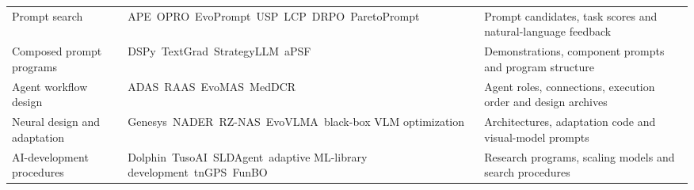 \begin{longtable}{@{}>{\raggedright\arraybackslash}p{}>{\raggedright\arraybackslash}p{}>{\raggedright\arraybackslash}p{}@{}}
\addlinespace[8pt]
Prompt search & APE~\citep{DBLP:conf/iclr/ZhouMHPPCB23}\newline OPRO~\citep{yang2024large}\newline EvoPrompt~\citep{guo2024connecting}\newline USP~\citep{wan-etal-2023-universal}\newline LCP~\citep{li-etal-2026-learning}\newline DRPO~\citep{singla-etal-2024-dynamic}\newline ParetoPrompt~\citep{zhao2025pareto} & Prompt candidates, task scores and natural-language feedback \\
\addlinespace[8pt]
Composed prompt programs & DSPy~\citep{khattab2024dspy}\newline TextGrad~\citep{Yuksekgonul2025}\newline StrategyLLM~\citep{gao2024strategyllm}\newline aPSF~\citep{liu-etal-2026-adaptive} & Demonstrations, component prompts and program structure \\
\addlinespace[8pt]
Agent workflow design & ADAS~\citep{hu2025automated}\newline RAAS~\citep{Yang2026raas}\newline EvoMAS~\citep{wei2026evomas}\newline MedDCR~\citep{zheng-etal-2026-meddcr} & Agent roles, connections, execution order and design archives \\
\addlinespace[8pt]
Neural design and adaptation & Genesys~\citep{cheng2025language}\newline NADER~\citep{Yang_2025_CVPR}\newline RZ-NAS~\citep{ji2025rznas}\newline EvoVLMA~\citep{Ding_2025}\newline black-box VLM optimization~\citep{Liu_2024_CVPR} & Architectures, adaptation code and visual-model prompts \\
\addlinespace[8pt]
AI-development procedures & Dolphin~\citep{yuan-etal-2025-dolphin}\newline TusoAI~\citep{turcan2026tusoai}\newline SLDAgent~\citep{lin2026can}\newline adaptive ML-library development~\citep{zhang2025adaptive}\newline tnGPS~\citep{pmlr-v235-zeng24b}\newline FunBO~\citep{aglietti2025funbo} & Research programs, scaling models and search procedures \\

\end{longtable}
